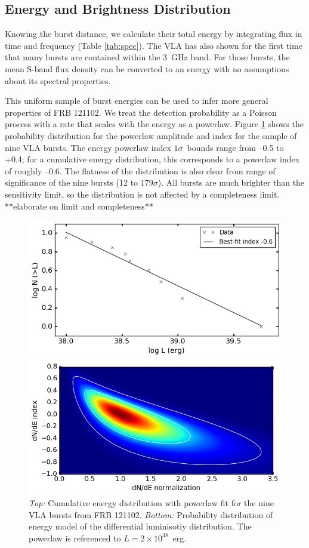 \documentclass[twocolumn]{aastex61}
\newcommand{\frb}{FRB 121102}
\begin{document}
\subsection{Energy and Brightness Distribution}
\label{sec:disn}
Knowing the burst distance, we calculate their total energy by integrating flux in time and frequency (Table \ref{tab:spec}). The VLA has also shown for the first time that many bursts are contained within the 3~GHz band. For those bursts, the mean S-band flux density can be converted to an energy with no assumptions about its spectral properties.

This uniform sample of burst energies can be used to infer more general properties of \frb. We treat the detection probability as a Poisson process with a rate that scales with the energy as a powerlaw. Figure \ref{fig:lumd} shows the probability distribution for the powerlaw amplitude and index for the sample of nine VLA bursts. The energy powerlaw index $1\sigma$\ bounds range from --0.5 to +0.4; for a cumulative energy distribution, this corresponds to a powerlaw index of roughly --0.6. The flatness of the distribution is also clear from range of significance of the nine bursts (12 to 179$\sigma$). All bursts are much brighter than the sensitivity limit, so the distribution is not affected by a completeness limit. **elaborate on limit and completeness**

\begin{figure}[htb]
\begin{center}
\includegraphics[width=0.9\columnwidth]{luminosity_cdisn}

\includegraphics[width=0.9\columnwidth]{luminosity_disn}
\caption{\emph{Top:} Cumulative energy distribution with powerlaw fit for the nine VLA bursts from \frb. \emph{Bottom:} Probability distribution of energy model of the differential luminisotiy distribution. The powerlaw is referenced to $L=2\times10^{38}$\ erg.
\label{fig:lumd}}
\end{center}
\end{figure}
\end{document}
